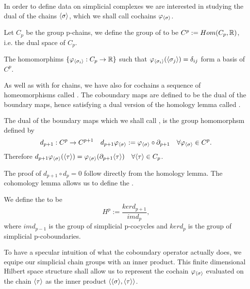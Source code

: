 \documentclass[../1.tex]{subfiles}
\begin{document}
    In order to define data on simplicial complexes we are interested in studying the dual of the chains $\langle \sigma \rangle$,
    which we shall call cochains $\varphi_{\langle \sigma \rangle}$.
       
    \begin{defn}
        Let $C_p$ be the group p-chains, we define the group of  to 
        be $C^p := Hom(C_p, \mathbb{R})$, i.e. the dual space of $C_p$.
    \end{defn}

    \begin{prop}
        The homomorphims $\{\varphi_{\langle \sigma_i \rangle}:C_p \to \mathbb{R}\}$ such that $\varphi_{\langle \sigma_i \rangle}(\langle \sigma_j \rangle) = \delta_{ij}$
        form a basis of $C^p$.
    \end{prop}

    As well as with for chains, we have also for cochains a sequence of homeomorphisms called . The coboundary maps are defined
    to be the dual of the boundary maps, hence satisfying a dual version of the homology lemma called .

    \begin{defn}
        The dual of the boundary maps which we shall call
        , is the group homomorphsm defined by
        \[ d_{p+1} : C^p \to C^{p+1} \quad d_{p+1}\varphi_{\langle \sigma \rangle} := \varphi_{\langle \sigma \rangle} \circ \partial_{p+1} \quad \forall \varphi_{\langle \sigma \rangle} \in C^p.\]
        Therefore $d_{p+1}\varphi_{\langle \sigma \rangle}(\langle \tau \rangle) = \varphi_{\langle \sigma \rangle} (\partial_{p+1}\langle \tau \rangle) \quad \forall \langle \tau \rangle \in C_p$.
    \end{defn}

    The proof of $d_{p+1} \circ d_p = 0$ follow directly from the homology lemma. The cohomology lemma allows us to define the .
    
    \begin{defn}
        We define the  to be 
        \[H^p := \frac{ker d_{p+1}}{im d_{p}},\] 
        where $im d_{p-1}$ is the group of simplicial p-cocycles and
        $ker d_p$ is the group of simplicial p-coboundaries.
    \end{defn}

    To have a specular intuition of what the coboundary operator actually does, we equipe our simplicial chain groups with
    an inner product. This finite dimensional Hilbert space structure shall allow us to represent the cochain $\varphi_{\langle \sigma \rangle}$ evaluated on the chain $\langle \tau \rangle$ 
    as the inner product $\langle \langle \sigma \rangle, \langle \tau \rangle \rangle$.
\end{document}
